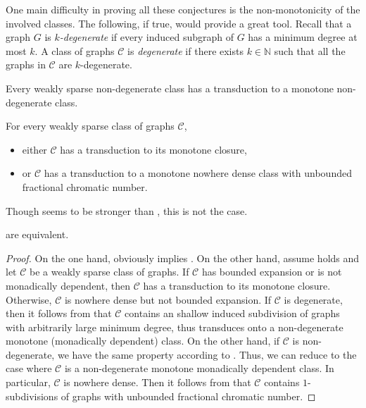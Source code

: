 \documentclass{lmcs}
\newcommand{\Cc}{\mathscr{C}}
\theoremstyle{definition}
\begin{document}
One main difficulty in proving all these conjectures is the non-monotonicity of the involved classes. The following, if true, would provide a great tool. Recall that a graph $G$ is \emph{$k$-degenerate} if every induced subgraph of $G$ has a minimum degree at most $k$. A class of graphs $\mathscr C$ is \emph{degenerate} if there exists $k\in\mathbb{N}$ such that all the graphs in $\mathscr C$ are $k$-degenerate. 

\begin{conj}
	\label{conj:nondeg}
	Every weakly sparse non-degenerate class has a transduction to a monotone non-degenerate  class.
\end{conj}

\pagebreak
\begin{conj}
	\label{conj:nondeg2}
	For every weakly sparse class of graphs $\Cc$,
	\begin{itemize}
		\item either $\Cc$ has a transduction to its monotone closure,
		\item or $\Cc$ has a transduction to a monotone nowhere dense class with unbounded fractional chromatic number.
	\end{itemize}
\end{conj}

Though  seems to be stronger than , this is not the case.

\begin{prop}
	 are equivalent.
\end{prop}
\begin{proof}
	On the one hand,  obviously implies . On the other hand, assume  holds and let $\Cc$ be a weakly sparse class of graphs. If $\Cc$ has bounded expansion or is not monadically dependent, then $\Cc$ has a transduction to its monotone closure. Otherwise, $\Cc$ is nowhere dense but not bounded expansion. If $\Cc$ is degenerate, then it follows from \cite{DVORAK2018143} that $\Cc$ contains an shallow induced subdivision of graphs with arbitrarily large minimum degree, thus transduces onto a non-degenerate monotone (monadically dependent) class. On the other hand, if $\Cc$ is non-degenerate, we have the same property according to .
	Thus, we can reduce to the case where $\Cc$ is a non-degenerate monotone  monadically dependent  class. In particular, $\Cc$ is nowhere dense. 
	Then it follows from \cite{chi_f} that $\Cc$ contains $1$-subdivisions of graphs with unbounded fractional chromatic number. 
\end{proof}




\end{document}

